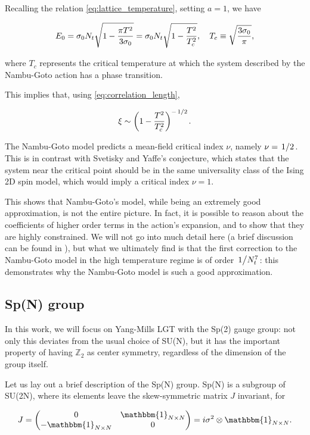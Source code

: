 \documentclass[reqno,12pt]{article}
\numberwithin{equation}{section}
\newcommand{\id}{\mathbbm{1}}
\begin{document}
Recalling the relation \eqref{eq:lattice_temperature}, setting $a=1$, we have

\begin{equation}
	E_0 = \sigma_0 N_t \sqrt{1 - \frac{\pi T^2}{3 \sigma_0}} = \sigma_0 N_t \sqrt{1 - \frac{T^2}{T_c^2}}
	\qc T_c \equiv \sqrt{\frac{3\sigma_0}{\pi}},
\end{equation}

where $T_c$ represents the critical temperature at which the system described by the Nambu-Goto action has a phase transition.

This implies that, using \eqref{eq:correlation_length},

\begin{equation}
	\xi \sim \qty(1 - \frac{T^2}{T_c^2})^{-\flatfrac{1}{2}}.
\end{equation}

The Nambu-Goto model predicts a mean-field critical index $\nu$, namely $\nu = \flatfrac{1}{2}$. This is in contrast with
Svetisky and Yaffe's conjecture, which states that the system near the critical point should be in the same universality class
of the Ising 2D spin model, which would imply a critical index $\nu = 1$. 

This shows that Nambu-Goto's model, while being an extremely good approximation, is not the entire picture. In fact, it is possible
to reason about the coefficients of higher order terms in the action's expansion, and to show that they are highly constrained. We will not
go into much detail here (a brief discussion can be found in \cite{caristo}), but what we ultimately find is that the first correction
to the Nambu-Goto model in the high temperature regime is of order $\flatfrac{1}{N_t^7}$: this demonstrates why the Nambu-Goto model
is such a good approximation.  

\subsection{Sp(N) group}

In this work, we will focus on Yang-Mills LGT with the Sp(2) gauge group: not only this deviates from the usual choice of SU(N), but
it has the important property of having $\mathbb{Z}_2$ as center symmetry, regardless of the dimension of the group itself. 

Let us lay out a brief description of the Sp(N) group. Sp(N) is a subgroup of SU(2N), where its elements leave the skew-symmetric
matrix $J$ invariant, for

\begin{equation}
	J = \mqty(0 & \id_{N \times N} \\ -\id_{N \times N} & 0) = i\sigma^2 \otimes \id_{N \times N}.
\end{equation}
\end{document}
